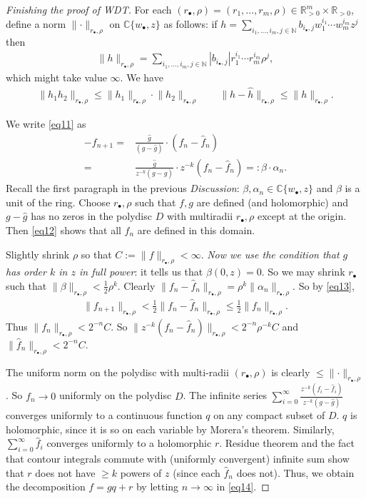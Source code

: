\documentclass[12pt,b5paper,notitlepage]{report}
\theoremstyle{definition}
\theoremstyle{plain}
\newcommand{\wht}{\widehat}
\newcommand{\blt}{\bullet}
\newcommand{\Cbb}{\mathbb C}
\newcommand{\Nbb}{\mathbb N}
\newcommand{\Rbb}{\mathbb R}
\numberwithin{equation}{section}
\begin{document}
\begin{proof}[Finishing the proof of WDT]
For each $(r_\blt,\rho)=(r_1,\dots,r_m,\rho)\in\Rbb_{>0}^m\times\Rbb_{>0}$, define a norm $\lVert\cdot \lVert_{r_\blt,\rho}$ on $\Cbb\{w_\blt,z\}$ as follows: if $h=\sum_{i_1,\dots,i_m,j\in\Nbb}b_{i_\blt,j}w_1^{i_1}\cdots w_m^{i_m}z^j$ then
\begin{align*}
\lVert h\lVert_{r_\blt,\rho}=\sum_{i_1,\dots,i_m,j\in\Nbb}|b_{i_\blt,j}|r_1^{i_1}\cdots r_m^{i_m}\rho^j,
\end{align*}
which might take value $\infty$. We have
\begin{align}
\lVert h_1h_2\lVert_{r_\blt,\rho}\leq \lVert h_1\lVert_{r_\blt,\rho}\cdot\lVert h_2\lVert_{r_\blt,\rho}\qquad \lVert h-\wht h\lVert_{r_\blt,\rho}\leq \lVert h\lVert_{r_\blt,\rho}.\label{eq13}
\end{align}


We write \eqref{eq11} as
\begin{align}
-f_{n+1}=&\frac{\wht g}{(g-\wht g)}\cdot (f_n-\wht f_n)\nonumber\\
=&\frac{\wht g}{z^{-k}(g-\wht g)}\cdot z^{-k}(f_n-\wht f_n)=:\beta\cdot \alpha_n.\label{eq12}
\end{align}
Recall the first paragraph in the previous \emph{Discussion}: $\beta,\alpha_n\in\Cbb\{w_\blt,z\}$ and $\beta$ is a unit of the ring. Choose $r_\blt,\rho$ such that $f,g$ are defined (and holomorphic) and $g-\wht g$ has no zeros in the polydisc $D$ with multiradii $r_\blt,\rho$ except at the origin. Then \eqref{eq12} shows that all $f_n$ are defined in this domain.

Slightly shrink $\rho$ so that $C:=\lVert f\lVert_{r_\blt,\rho}<\infty$. \emph{Now we use the condition that $g$ has order $k$ in $z$ in full power}: it tells us that $\beta(0,z)=0$. So we may shrink $r_\blt$ such that $\lVert\beta\lVert_{r_\blt,\rho}<\frac 12\rho^k$. Clearly $\lVert f_n-\wht f_n\lVert_{r_\blt,\rho}=\rho^k\lVert\alpha_n\lVert_{r_\blt,\rho}$. So by \eqref{eq13}, 
\begin{align*}
\lVert f_{n+1}\lVert_{r_\blt,\rho}<\frac 12\lVert f_n-\wht f_n\lVert_{r_\blt,\rho}\leq \frac 12\lVert f_n\lVert_{r_\blt,\rho}.
\end{align*}
Thus $\lVert f_n\lVert_{r_\blt,\rho}< 2^{-n}C$. So $\lVert z^{-k}(f_n-\wht f_n)\lVert_{r_\blt,\rho}<2^{-n}\rho^{-k}C$ and $\lVert\wht f_n\lVert_{r_\blt,\rho}<2^{-n}C$.

The uniform norm on the polydisc with multi-radii $(r_\blt,\rho)$ is clearly $\leq \lVert\cdot\lVert_{r_\blt,\rho}$. So $f_n\rightarrow 0$ uniformly on the polydisc $D$. 
The infinite series $\sum_{i=0}^\infty\frac{z^{-k}(f_i-\wht f_i)}{z^{-k}(g-\wht g)}$ converges uniformly to a continuous function $q$ on any compact subset of $D$. $q$ is holomorphic, since it is so on each variable by Morera's theorem. Similarly, $\sum_{i=0}^\infty\wht f_i$ converges uniformly to a holomorphic $r$. Residue theorem and the fact that contour integrals commute with (uniformly convergent) infinite sum show that $r$ does not have $\geq k$ powers of $z$ (since each $\wht f_n$ does not). Thus, we obtain the decomposition $f=gq+r$ by letting $n\rightarrow\infty$ in \eqref{eq14}.
\end{proof}
\end{document}
